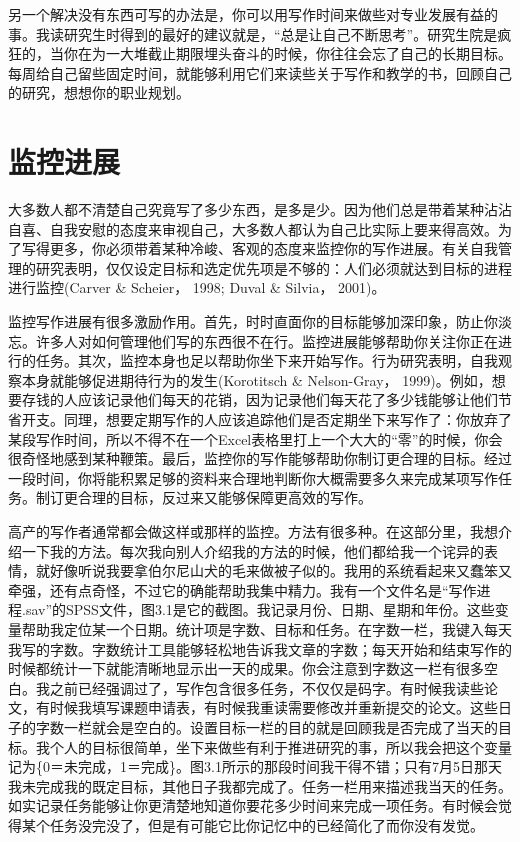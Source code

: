 另一个解决没有东西可写的办法是，你可以用写作时间来做些对专业发展有益的事。我读研究生时得到的最好的建议就是，“总是让自己不断思考”。研究生院是疯狂的，当你在为一大堆截止期限埋头奋斗的时候，你往往会忘了自己的长期目标。每周给自己留些固定时间，就能够利用它们来读些关于写作和教学的书，回顾自己的研究，想想你的职业规划。


\section{监控进展}
大多数人都不清楚自己究竟写了多少东西，是多是少。因为他们总是带着某种沾沾自喜、自我安慰的态度来审视自己，大多数人都认为自己比实际上要来得高效。为了写得更多，你必须带着某种冷峻、客观的态度来监控你的写作进展。有关自我管理的研究表明，仅仅设定目标和选定优先项是不够的：人们必须就达到目标的进程进行监控(Carver \& Scheier， 1998; Duval \& Silvia， 2001)。

监控写作进展有很多激励作用。首先，时时直面你的目标能够加深印象，防止你淡忘。许多人对如何管理他们写的东西很不在行。监控进展能够帮助你关注你正在进行的任务。其次，监控本身也足以帮助你坐下来开始写作。行为研究表明，自我观察本身就能够促进期待行为的发生(Korotitsch \& Nelson-Gray， 1999)。例如，想要存钱的人应该记录他们每天的花销，因为记录他们每天花了多少钱能够让他们节省开支。同理，想要定期写作的人应该追踪他们是否定期坐下来写作了：你放弃了某段写作时间，所以不得不在一个Excel表格里打上一个大大的“零”的时候，你会很奇怪地感到某种鞭策。最后，监控你的写作能够帮助你制订更合理的目标。经过一段时间，你将能积累足够的资料来合理地判断你大概需要多久来完成某项写作任务。制订更合理的目标，反过来又能够保障更高效的写作。

高产的写作者通常都会做这样或那样的监控。方法有很多种。在这部分里，我想介绍一下我的方法。每次我向别人介绍我的方法的时候，他们都给我一个诧异的表情，就好像听说我要拿伯尔尼山犬的毛来做被子似的。我用的系统看起来又蠢笨又牵强，还有点奇怪，不过它的确能帮助我集中精力。我有一个文件名是“写作进程.sav”的SPSS文件，图3.1是它的截图。我记录月份、日期、星期和年份。这些变量帮助我定位某一个日期。统计项是字数、目标和任务。在字数一栏，我键入每天我写的字数。字数统计工具能够轻松地告诉我文章的字数；每天开始和结束写作的时候都统计一下就能清晰地显示出一天的成果。你会注意到字数这一栏有很多空白。我之前已经强调过了，写作包含很多任务，不仅仅是码字。有时候我读些论文，有时候我填写课题申请表，有时候我重读需要修改并重新提交的论文。这些日子的字数一栏就会是空白的。设置目标一栏的目的就是回顾我是否完成了当天的目标。我个人的目标很简单，坐下来做些有利于推进研究的事，所以我会把这个变量记为\{0＝未完成，1＝完成\}。图3.1所示的那段时间我干得不错；只有7月5日那天我未完成我的既定目标，其他日子我都完成了。任务一栏用来描述我当天的任务。如实记录任务能够让你更清楚地知道你要花多少时间来完成一项任务。有时候会觉得某个任务没完没了，但是有可能它比你记忆中的已经简化了而你没有发觉。

